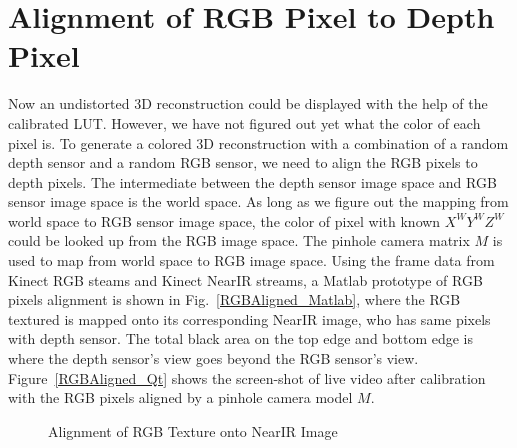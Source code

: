 \section{Alignment of RGB Pixel to Depth Pixel}
Now an undistorted 3D reconstruction could be displayed with the help of the calibrated LUT. However, we have not figured out yet what the color of each pixel is. To generate a colored 3D reconstruction with a combination of a random depth sensor and a random RGB sensor, we need to align the RGB pixels to depth pixels. The intermediate between the depth sensor image space and RGB sensor image space is the world space. As long as we figure out the mapping from world space to RGB sensor image space, the color of pixel with known \(X^WY^WZ^W\) could be looked up from the RGB image space. The pinhole camera matrix \(M\) is used to map from world space to RGB image space. Using the frame data from Kinect RGB steams and Kinect NearIR streams, a Matlab prototype of RGB pixels alignment is shown in Fig.~\ref{RGBAligned_Matlab}, where the RGB textured is mapped onto its corresponding NearIR image, who has same pixels with depth sensor. The total black area on the top edge and bottom edge is where the depth sensor's view goes beyond the RGB sensor's view. Figure~\ref{RGBAligned_Qt} shows the screen-shot of live video after calibration with the RGB pixels aligned by a pinhole camera model \(M\).

%
 \begin{figure}[t]
\hspace*{-0.5cm}
\centering
{}
\caption{Alignment of RGB Texture onto NearIR Image}
\label{Adaptive_Thresholding}
\end{figure}%
%

